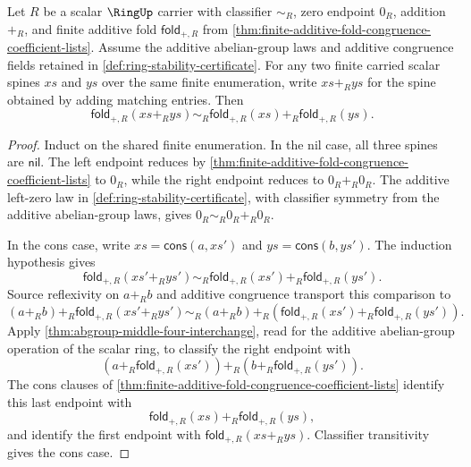 \begin{lemma}
\label{lem:finite-additive-fold-separates-pointwise-scalar-sums}
Let $R$ be a scalar $\RingUp$ carrier with classifier $\sim_R$, zero endpoint $0_R$, addition $+_R$, and finite additive fold $\mathsf{fold}_{+,R}$ from \autoref{thm:finite-additive-fold-congruence-coefficient-lists}. Assume the additive abelian-group laws and additive congruence fields retained in \autoref{def:ring-stability-certificate}. For any two finite carried scalar spines $xs$ and $ys$ over the same finite enumeration, write $xs+_Rys$ for the spine obtained by adding matching entries. Then
$$
\mathsf{fold}_{+,R}(xs+_Rys)\sim_R
\mathsf{fold}_{+,R}(xs)+_R\mathsf{fold}_{+,R}(ys).
$$
\end{lemma}
\begin{proof}
Induct on the shared finite enumeration. In the nil case, all three spines are $\mathsf{nil}$. The left endpoint reduces by \autoref{thm:finite-additive-fold-congruence-coefficient-lists} to $0_R$, while the right endpoint reduces to $0_R+_R0_R$. The additive left-zero law in \autoref{def:ring-stability-certificate}, with classifier symmetry from the additive abelian-group laws, gives $0_R\sim_R0_R+_R0_R$.

In the cons case, write $xs=\mathsf{cons}(a,xs')$ and $ys=\mathsf{cons}(b,ys')$. The induction hypothesis gives
$$
\mathsf{fold}_{+,R}(xs'+_Rys')\sim_R
\mathsf{fold}_{+,R}(xs')+_R\mathsf{fold}_{+,R}(ys').
$$
Source reflexivity on $a+_Rb$ and additive congruence transport this comparison to
$$
(a+_Rb)+_R\mathsf{fold}_{+,R}(xs'+_Rys')
\sim_R
(a+_Rb)+_R(\mathsf{fold}_{+,R}(xs')+_R\mathsf{fold}_{+,R}(ys')).
$$
Apply \autoref{thm:abgroup-middle-four-interchange}, read for the additive abelian-group operation of the scalar ring, to classify the right endpoint with
$$
(a+_R\mathsf{fold}_{+,R}(xs'))+_R(b+_R\mathsf{fold}_{+,R}(ys')).
$$
The cons clauses of \autoref{thm:finite-additive-fold-congruence-coefficient-lists} identify this last endpoint with
$$
\mathsf{fold}_{+,R}(xs)+_R\mathsf{fold}_{+,R}(ys),
$$
and identify the first endpoint with $\mathsf{fold}_{+,R}(xs+_Rys)$. Classifier transitivity gives the cons case.
\end{proof}

